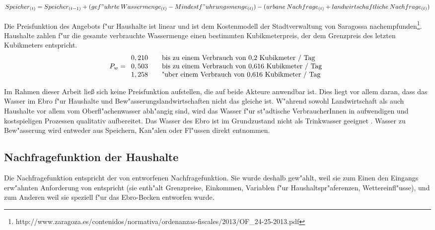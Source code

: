 \documentclass[11pt,a4paper]{article}
\begin{document}
\begin{dmath}
Speicher_{(t)} = Speicher_{(t-1)} + (gef"uhrte\:Wassermenge_{(t)} - Mindestf"uhrungsmenge_{(t)}) - (urbane\:Nachfrage_{(t)} + landwirtschaftliche\:Nachfrage_{(t)})
\label{eq:supply-function}
\end{dmath}

Die Preisfunktion des Angebots f"ur Haushalte ist linear und ist dem Kostenmodell der Stadtverwaltung von Saragossa nachempfunden\footnote{http://www.zaragoza.es/contenidos/normativa/ordenanzas-fiscales/2013/OF_24-25-2013.pdf}. Haushalte zahlen f"ur die gesamte verbrauchte Wassermenge einen bestimmten Kubikmeterpreis, der dem Grenzpreis des letzten Kubikmeters entspricht.\\
\begin{dmath}
P_{w} = 
	\begin{array}{l l}
	0,210 & \quad \text{bis zu einem Verbrauch von 0,2 Kubikmeter / Tag}\\
	0,503 & \quad \text{bis zu einem Verbrauch von 0,616 Kubikmeter / Tag}\\
	1,258 & \quad \text{"uber einem Verbrauch von 0,616 Kubikmeter / Tag}
	\end{array}
\label{eq:household-price-function}
\end{dmath}

Im Rahmen dieser Arbeit ließ sich keine Preisfunktion aufstellen, die auf beide Akteure anwendbar ist. Dies liegt vor allem daran, dass das Wasser im Ebro f"ur Haushalte und Bew"asserungslandwirtschaften nicht das gleiche ist. W"ahrend sowohl Landwirtschaft als auch Haushalte vor allem vom Oberfl"achenwasser abh"angig sind, wird das Wasser f"ur st"adtische VerbraucherInnen in aufwendigen und kostspieligen Prozessen qualitativ aufbereitet. Das Wasser des Ebro ist im Grundzustand nicht als Trinkwasser geeignet \citep{Penagos2007}. Wasser zu Bew"asserung wird entweder aus Speichern, Kan"alen oder Fl"ussen direkt entnommen.

\subsection{Nachfragefunktion der Haushalte}\label{sec:Nachfrage-hh}

Die Nachfragefunktion entspricht der von \cite{Arbues2010} entworfenen Nachfragefunktion. Sie wurde deshalb gew"ahlt, weil sie zum Einen den Eingangs erw"ahnten Anforderung von \cite{Olmstead2010} entspricht (sie enth"alt Grenzpreise, Einkommen, Variablen f"ur Haushaltspr"aferenzen, Wettereinfl"usse), und zum Anderen weil sie speziell f"ur das Ebro-Becken entworfen wurde.\\
\end{document}
